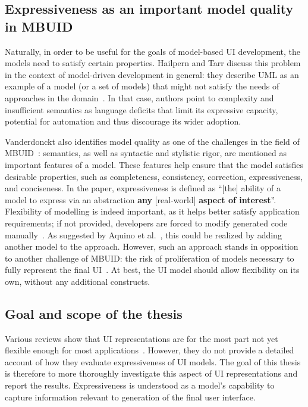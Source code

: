 \subsection{Expressiveness as an important model quality in MBUID}\label{subsec:model-quality-in-mbuid}
Naturally, in order to be useful for the goals of model-based UI development, the models need to satisfy certain properties.
Hailpern and Tarr discuss this problem in the context of model-driven development in general: they describe UML as an example of a model (or a set of models) that might not satisfy the needs of approaches in the domain~\cite{Hailpern2006}.
In that case, authors point to complexity and insufficient semantics as language deficits that limit its expressive capacity, potential for automation and thus discourage its wider adoption.

Vanderdonckt also identifies model quality as one of the challenges in the field of MBUID~\cite{Vanderdonckt2008}: semantics, as well as syntactic and stylistic rigor, are mentioned as important features of a model.
These features help ensure that the model satisfies desirable properties, such as completeness, consistency, correction, expressiveness, and conciseness.
In the paper, expressiveness is defined as \enquote{[the] ability of a model to express via an abstraction \textbf{any} [real-world] \textbf{aspect of interest}}.
Flexibility of modelling is indeed important, as it helps better satisfy application requirements;
if not provided, developers are forced to modify generated code manually~\cite{Pederiva2007}.
As suggested by Aquino et al.~\cite{Aquino2010}, this could be realized by adding another model to the approach.
However, such an approach stands in opposition to another challenge of MBUID: the risk of proliferation of models necessary to fully represent the final UI~\cite{Vanderdonckt2008}.
At best, the UI model should allow flexibility on its own, without any additional constructs.

\subsection{Goal and scope of the thesis}\label{subsec:goal-and-scope}

Various reviews show that UI representations are for the most part not yet flexible enough for most applications~\cite{Ruiz2018, Souchon2003}.
However, they do not provide a detailed account of how they evaluate expressiveness of UI models.
The goal of this thesis is therefore to more thoroughly investigate this aspect of UI representations and report the results.
Expressiveness is understood as a model's capability to capture information relevant to generation of the final user interface.

